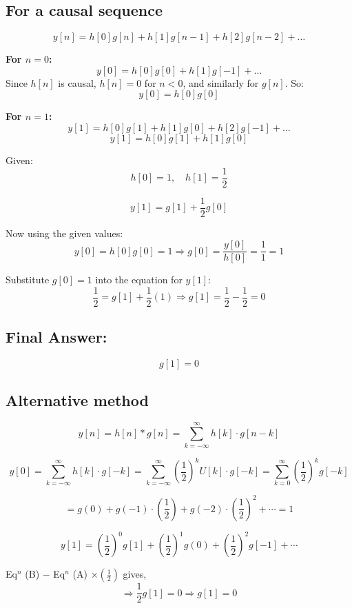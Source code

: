 \documentclass[12pt]{article}
\begin{document}
	\subsection*{For a causal sequence}
	\[
	y[n] = h[0] g[n] + h[1] g[n-1] + h[2] g[n-2] + \ldots
	\]
	
	\textbf{For \( n = 0 \):}
	\[
	y[0] = h[0] g[0] + h[1] g[-1] + \ldots
	\]
	Since \( h[n] \) is causal, \( h[n] = 0 \) for \( n < 0 \), and similarly for \( g[n] \). So:
	\[
	y[0] = h[0] g[0]
	\]
	
	\textbf{For \( n = 1 \):}
	\[
	y[1] = h[0] g[1] + h[1] g[0] + h[2] g[-1] + \ldots
	\]
	\[
	y[1] = h[0] g[1] + h[1] g[0]
	\]
	
	Given:
	\[
	h[0] = 1, \quad h[1] = \frac{1}{2}
	\]
	
	\[
	y[1] = g[1] + \frac{1}{2} g[0]
	\]
	
	Now using the given values:
	\[
	y[0] = h[0] g[0] = 1 \Rightarrow g[0] = \frac{y[0]}{h[0]} = \frac{1}{1} = 1
	\]
	
	Substitute \( g[0] = 1 \) into the equation for \( y[1] \):
	\[
	\frac{1}{2} = g[1] + \frac{1}{2}(1) \Rightarrow g[1] = \frac{1}{2} - \frac{1}{2} = 0
	\]
	
	\subsection*{Final Answer:}
	\[
	g[1] = 0
	\]
	
	\subsection*{Alternative method}
	\[
	y[n] = h[n] * g[n]
	= \sum_{k=-\infty}^{\infty} h[k] \cdot g[n - k]
	\]
	
	\[
	y[0] = \sum_{k=-\infty}^{\infty} h[k] \cdot g[-k]
	= \sum_{k=-\infty}^{\infty} \left(\frac{1}{2}\right)^k U[k] \cdot g[-k]
	= \sum_{k=0}^{\infty} \left(\frac{1}{2}\right)^k g[-k]
	\]
	
	\[
	= g(0) + g(-1) \cdot \left(\frac{1}{2}\right) + g(-2) \cdot \left(\frac{1}{2}\right)^2 + \cdots = 1 \tag{A}
	\]
	
	\[
	y[1] = \left(\frac{1}{2}\right)^0 g[1] + \left(\frac{1}{2}\right)^1 g(0) + \left(\frac{1}{2}\right)^2 g[-1] + \cdots \tag{B}
	\]
	
	\vspace{1em}
	
	\noindent
	Eq$^{n}$ (B) $-$ Eq$^{n}$ (A) $\times \left(\frac{1}{2}\right)$ gives, \\
	\[
	\Rightarrow \frac{1}{2} g[1] = 0
	\Rightarrow g[1] = 0
	\]
	
\end{document}
